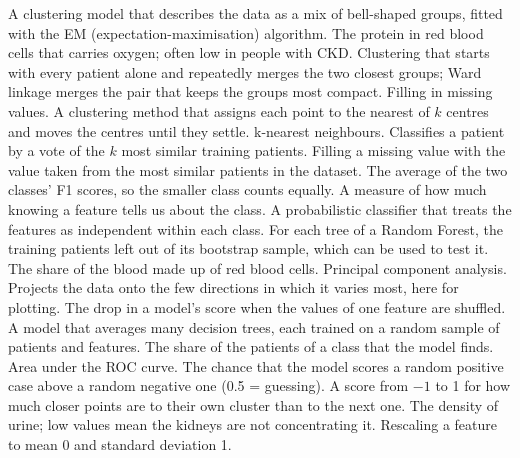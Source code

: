 {\begin{description}[style=sameline, leftmargin=3.6cm, labelwidth=3.4cm, labelsep=0.2cm, itemsep=1pt, parsep=0pt, topsep=2pt, font=\normalfont\bfseries]
     A clustering model that describes the data as a mix of bell-shaped groups, fitted with the EM (expectation-maximisation) algorithm.
     The protein in red blood cells that carries oxygen; often low in people with CKD.
     Clustering that starts with every patient alone and repeatedly merges the two closest groups; Ward linkage merges the pair that keeps the groups most compact.
     Filling in missing values.
     A clustering method that assigns each point to the nearest of $k$ centres and moves the centres until they settle.
     k-nearest neighbours. Classifies a patient by a vote of the $k$ most similar training patients.
     Filling a missing value with the value taken from the most similar patients in the dataset.
     The average of the two classes' F1 scores, so the smaller class counts equally.
     A measure of how much knowing a feature tells us about the class.
     A probabilistic classifier that treats the features as independent within each class.
     For each tree of a Random Forest, the training patients left out of its bootstrap sample, which can be used to test it.
     The share of the blood made up of red blood cells.
     Principal component analysis. Projects the data onto the few directions in which it varies most, here for plotting.
     The drop in a model's score when the values of one feature are shuffled.
     A model that averages many decision trees, each trained on a random sample of patients and features.
     The share of the patients of a class that the model finds.
     Area under the ROC curve. The chance that the model scores a random positive case above a random negative one (0.5 = guessing).
     A score from $-1$ to 1 for how much closer points are to their own cluster than to the next one.
     The density of urine; low values mean the kidneys are not concentrating it.
     Rescaling a feature to mean 0 and standard deviation 1.

\end{description}}

